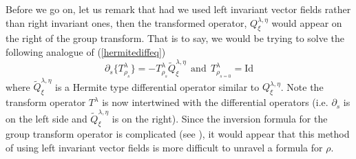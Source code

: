 \documentclass[12pt,reqno]{amsart}
\theoremstyle{definition}
\begin{document}
Before we go on, let us remark that had we used
left invariant vector fields rather than right invariant
ones, then the transformed operator, $Q_\xi^{\lambda,\eta}$
would appear on the right of the group transform.
That is to say, we would be trying to solve 
the following analogue of (\ref{hermitediffeq})
\[
 {\partial}_s \{T^\lambda_{\rho_s}  \}
= -T^\lambda_{\rho_s} \tilde Q_\xi^{\lambda,\eta} \ \ 
\textrm{and} \ \ T^\lambda_{\rho_{s=0}} = \textrm{Id}
\]
where $\tilde Q_\xi^{\lambda,\eta}$ is a Hermite type differential
operator similar to $ Q_\xi^{\lambda,\eta}$.
Note the transform operator $T^\lambda$  is now intertwined
with the differential operators (i.e. ${\partial}_s$ is on the 
left side and $\tilde Q_\xi^{\lambda,\eta}$ is on the right).
Since the inversion formula for the group transform operator
is complicated (see  \cite{PeRi03}), it would appear
that this method of using left invariant vector fields
is more difficult to unravel a formula for $\rho$.
\end{document}
